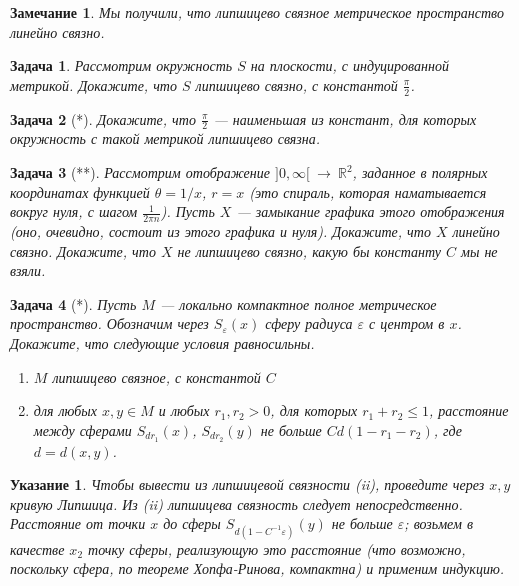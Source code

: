 \documentclass[12pt]{book}
\newcommand{\arrow}{{\:\longrightarrow\:}}
\renewcommand{\epsilon}{\varepsilon}
\def\R{{\mathbb R}}
\theoremstyle{upshape}
\newtheorem{zadacha}{Задача}[chapter]
\theoremstyle{generic}
\theoremstyle{upshapenonumber}
\newtheorem{ukazanie}{Указание}[section]
\newtheorem{zamechanie}{Замечание}[chapter]
\renewcommand{\labelenumi}{\ralph{enumi}.}
\newcommand{\следствие}{%
     \refstepcounter{teorema}
     {\noindent\bf Следствие \thechapter.\arabic{teorema}:\ }}
\newcommand{\пример}{%
     \refstepcounter{teorema}
     {\noindent\bf Пример \thechapter.\arabic{teorema}:\ }}
\newcommand{\лемма}{%
     \refstepcounter{teorema}
     {\noindent\bf Лемма \thechapter.\arabic{teorema}:\ }}
\newcommand{\теорема}{%
     \refstepcounter{teorema}
     {\noindent\bf Теорема \thechapter.\arabic{teorema}:\ }}
\newcommand{\утверждение}{%
     \refstepcounter{teorema}
     {\noindent\bf Утверждение \thechapter.\arabic{teorema}:\ }}
\begin{document}
{\begin{zamechanie}
Мы получили, что липшицево связное метрическое
пространство линейно связно.
\end{zamechanie}

\begin{zadacha}  
Рассмотрим окружность $S$ на плоскости, 
с индуцированной метрикой. Докажите, что
$S$ липшицево связно, с константой $\frac \pi 2$.
\end{zadacha}

\begin{zadacha}[*]
Докажите, что $\frac \pi 2$ --- наименьшая из
констант, для которых окружность с такой метрикой 
липшицево связна.
\end{zadacha}

\begin{zadacha}[**]
Рассмотрим отображение $]0, \infty[ \arrow \R^2$,
заданное в полярных координатах функцией
$\theta = 1/x$, $r=x$ (это спираль,
которая наматывается вокруг нуля, с шагом $\frac 1 {2\pi n}$).
Пусть $X$ --- замыкание графика этого отображения
(оно, очевидно, состоит из этого графика и нуля).
Докажите, что $X$ линейно связно. Докажите, что
$X$ не липшицево связно, какую бы константу $C$ мы не взяли.
\end{zadacha}

\begin{zadacha}[*]
Пусть $M$ --- локально компактное полное метрическое пространство.
Обозначим через $S_\epsilon(x)$ сферу радиуса $\epsilon$ с центром в $x$.
Докажите, что следующие условия равносильны.
\begin{enumerate}
\renewcommand{\labelenumi}{(\roman{enumi})}
\item $M$ липшицево связное, с константой $C$

\item для любых $x, y \in M$ и любых $r_1, r_2 >0$, для которых $r_1 + r_2 \leq 1$,
расстояние между сферами $S_{dr_1}(x)$, $S_{dr_2}(y)$
не больше $C d (1-r_1-r_2)$, где $d= d(x,y)$.
\end{enumerate}
\end{zadacha}


\begin{ukazanie}
Чтобы вывести из липшицевой связности 
(ii), проведите через $x, y$ кривую Липшица. 
Из (ii) липшицева связность следует непосредственно.
Расстояние от точки $x$ до сферы $S_{d(1-C^{-1}\epsilon)}(y)$
не больше $\epsilon$; возьмем в качестве $x_2$
точку сферы, реализующую это расстояние (что
возможно, поскольку сфера, по теореме Хопфа-Ринова, 
компактна) и применим индукцию.
\end{ukazanie}

}
\end{document}

